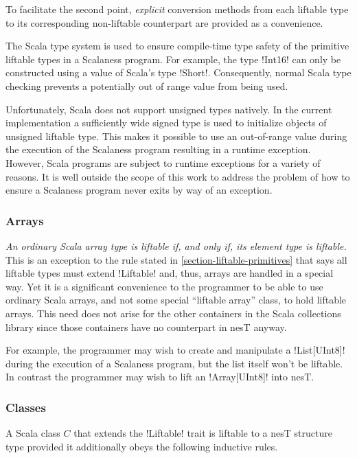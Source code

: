 To facilitate the second point, \emph{explicit} conversion methods from each liftable type to
its corresponding non-liftable counterpart are provided as a convenience.

The Scala type system is used to ensure compile-time type safety of the primitive liftable types
in a Scalaness program. For example, the type !Int16! can only be constructed using a value of
Scala's type !Short!. Consequently, normal Scala type checking prevents a potentially out of
range value from being used.

Unfortunately, Scala does not support unsigned types natively. In the current implementation a
sufficiently wide signed type is used to initialize objects of unsigned liftable type. This
makes it possible to use an out-of-range value during the execution of the Scalaness program
resulting in a runtime exception. However, Scala programs are subject to runtime exceptions for
a variety of reasons. It is well outside the scope of this work to address the problem of how to
ensure a Scalaness program never exits by way of an exception.

\subsubsection{Arrays}
\label{section-liftable-arrays}

\emph{An ordinary Scala array type is liftable if, and only if, its element type is liftable.}
This is an exception to the rule stated in \autoref{section-liftable-primitives} that says all
liftable types must extend !Liftable! and, thus, arrays are handled in a special way. Yet it is a
significant convenience to the programmer to be able to use ordinary Scala arrays, and not some
special ``liftable array'' class, to hold liftable arrays. This need does not arise for the
other containers in the Scala collections library since those containers have no counterpart in
nesT anyway.

For example, the programmer may wish to create and manipulate a !List[UInt8]! during the
execution of a Scalaness program, but the list itself won't be liftable. In contrast the
programmer may wish to lift an !Array[UInt8]! into nesT.

\subsubsection{Classes}
\label{section-liftable-classes}

A Scala class $C$ that extends the !Liftable! trait is liftable to a nesT structure type
provided it additionally obeys the following inductive rules.

